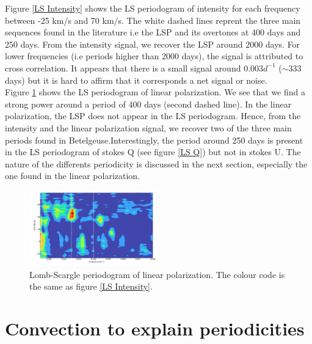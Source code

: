 \documentclass{aa}
\begin{document}
Figure \ref{LS Intensity} shows the LS periodogram of intensity for each frequency between -25 km/s and 70 km/s. The white dashed lines reprent the three main sequences found in the literature i.e the LSP and its overtones at 400 days and 250 days. From the intensity signal, we recover the LSP around 2000 days. For lower frequencies (i.e periods higher than 2000 days), the signal is attributed to cross correlation. It appears that there is a small signal around $0.003 d^{-1}$ ($\sim 333$ days) but it is hard to affirm that it corresponds a net signal or noise. \\

Figure \ref{LS Pl} shows the LS periodogram of linear polarization. We see that we find a strong power around a period of 400 days (second dashed line). In the linear polarization, the LSP does not appear in the LS periodogram. Hence, from the intensity and the linear polarization signal, we recover two of the three main periods found in Betelgeuse.Interestingly, the period around 250 days is present in the LS periodogram of stokes Q (see figure \ref{LS Q}) but not in stokes U. The nature of the differents periodicity is discussed in the next section, especially the one found in the linear polarization. 


\begin{figure}[!h]
    \centering
    \includegraphics[width=0.5\textwidth]{LS Pl.png}
    \caption{Lomb-Scargle periodogram of linear polarization. The colour code is the same as figure \ref{LS Intensity}. }
    \label{LS Pl}
\end{figure}

\section{Convection to explain periodicities}
\end{document}
